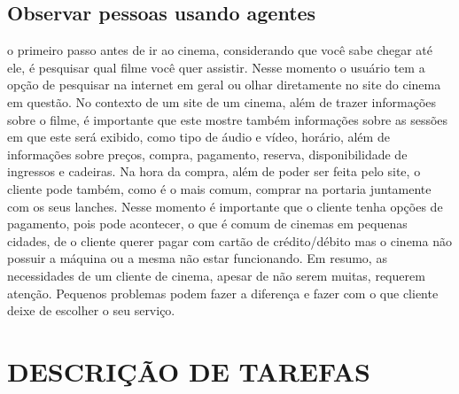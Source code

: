 \documentclass[12pt]{article}
\begin{document}
     \subsection{Observar pessoas usando agentes}
        o primeiro passo antes de ir ao cinema, considerando que você sabe chegar até ele, é pesquisar qual filme você quer assistir. Nesse momento o usuário tem a opção de pesquisar na internet em geral ou olhar diretamente no site do cinema em questão. 
        No contexto de um site de um cinema, além de trazer informações sobre o filme, é importante que este mostre também informações sobre as sessões em que este será exibido, como tipo de áudio e vídeo, horário, além de informações sobre preços, compra,  pagamento, reserva, disponibilidade de ingressos e cadeiras.
        Na hora da compra, além de poder ser feita pelo site, o cliente pode também, como é o mais comum, comprar na portaria juntamente com os seus lanches. Nesse momento é importante que o cliente tenha opções de pagamento, pois pode acontecer, o que é comum de cinemas em pequenas cidades, de o cliente querer pagar com cartão de crédito/débito mas o cinema não possuir a máquina ou a mesma não estar funcionando.
        Em resumo, as necessidades de um cliente de cinema, apesar de não serem muitas, requerem atenção. Pequenos problemas podem fazer a diferença e fazer com o que cliente deixe de escolher o seu serviço.
     
    \section{DESCRIÇÃO DE TAREFAS}
\end{document}
